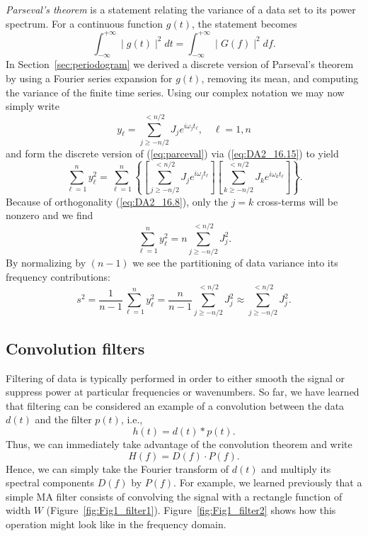 \emph{Parseval's theorem} is a statement relating the variance of a data set to its power spectrum.
For a continuous function $g(t)$, the statement becomes
\begin{equation}
	\int_{-\infty}^{+\infty} \mid g(t) \mid^2 dt = \int_{-\infty}^{+\infty} \mid G(f) \mid^2 df.
	\label{eq:parceval}
\end{equation}
In Section~\ref{sec:periodogram} we derived a discrete version of Parseval's theorem by using a Fourier series expansion
for $g(t)$, removing its mean, and computing the variance of the finite time series.  Using
our complex notation we may now simply write
\begin{equation}
y_{\ell} = \sum^{< n/2}_{j \geq -n/2} J_j e^{i \omega_j t_{\ell}}, \quad \ell = 1,n
\end{equation}
and form the discrete version of (\ref{eq:parceval}) via (\ref{eq:DA2_16.15}) to yield
\begin{equation}
\sum^{n}_{\ell=1} y_{\ell}^2 = \sum^{n}_{\ell=1} \left \{ \left [ \sum^{< n/2}_{j \geq -n/2} J_j e^{i \omega_j t_{\ell}} \right ] \left [ \sum^{< n/2}_{k \geq -n/2} J_k e^{i \omega_k t_{\ell}} \right ] \right \}.
\end{equation}
Because of orthogonality (\ref{eq:DA2_16.8}), only the $j = k$ cross-terms will be nonzero and we find
\begin{equation}
\sum^{n}_{\ell=1} y_{\ell}^2 = n\sum^{< n/2}_{j \geq -n/2} J_j^2.
\end{equation}
By normalizing by $(n-1)$ we see the partitioning of data variance into its frequency contributions:
\begin{equation}
s^2 = \frac{1}{n-1}\sum^{n}_{\ell=1} y_{\ell}^2 = \frac{n}{n-1}\sum^{< n/2}_{j \geq -n/2} J_j^2  \approx \sum^{< n/2}_{j \geq -n/2} J_j^2.
\end{equation}

\subsection{Convolution filters}

	Filtering of data is typically performed in order to either smooth the signal or suppress power at 
particular frequencies or wavenumbers.  So far, we have learned that filtering can be considered an 
example of a convolution between the data $d(t)$ and the filter $p(t)$, i.e.,
\begin{equation}
h(t) = d(t) * p(t).
\end{equation}
Thus, we can immediately take advantage of the convolution theorem and write
\begin{equation}
H(f) = D(f) \cdot P(f).
\end{equation}
Hence, we can simply take the Fourier transform of $d(t)$ and multiply its spectral components $D(f)$ by 
$P(f)$.  For example, we learned previously that a simple MA filter consists of convolving the signal with a 
rectangle function of width $W$ (Figure~\ref{fig:Fig1_filter1}).
\noindent
Figure~\ref{fig:Fig1_filter2} shows how this operation might look like in the frequency domain.

